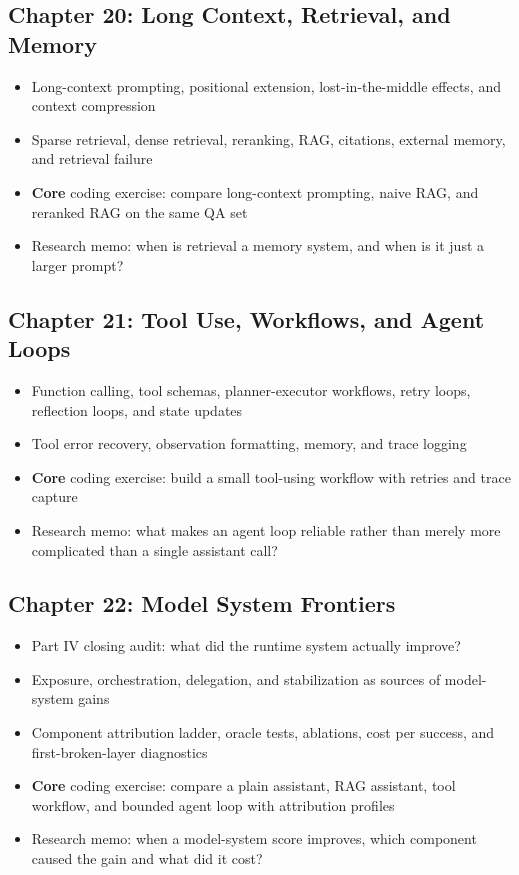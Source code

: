 \documentclass[11pt]{article}
\begin{document}
\subsection{Chapter 20: Long Context, Retrieval, and Memory}

\begin{itemize}
    \item Long-context prompting, positional extension, lost-in-the-middle effects, and context compression
    \item Sparse retrieval, dense retrieval, reranking, RAG, citations, external memory, and retrieval failure
    \item \textbf{Core} coding exercise: compare long-context prompting, naive RAG, and reranked RAG on the same QA set
    \item Research memo: when is retrieval a memory system, and when is it just a larger prompt?
\end{itemize}

\subsection{Chapter 21: Tool Use, Workflows, and Agent Loops}

\begin{itemize}
    \item Function calling, tool schemas, planner-executor workflows, retry loops, reflection loops, and state updates
    \item Tool error recovery, observation formatting, memory, and trace logging
    \item \textbf{Core} coding exercise: build a small tool-using workflow with retries and trace capture
    \item Research memo: what makes an agent loop reliable rather than merely more complicated than a single assistant call?
\end{itemize}

\subsection{Chapter 22: Model System Frontiers}

\begin{itemize}
    \item Part IV closing audit: what did the runtime system actually improve?
    \item Exposure, orchestration, delegation, and stabilization as sources of model-system gains
    \item Component attribution ladder, oracle tests, ablations, cost per success, and first-broken-layer diagnostics
    \item \textbf{Core} coding exercise: compare a plain assistant, RAG assistant, tool workflow, and bounded agent loop with attribution profiles
    \item Research memo: when a model-system score improves, which component caused the gain and what did it cost?
\end{itemize}
\end{document}
